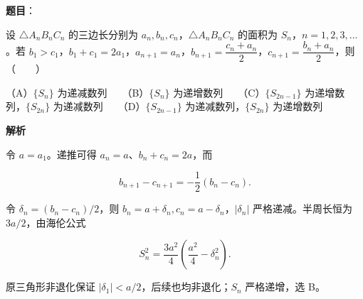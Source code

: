 \begin{answer}

\textbf{题目}：

设 $\triangle A_nB_nC_n$ 的三边长分别为 $a_n,b_n,c_n$，$\triangle A_nB_nC_n$ 的面积为 $S_n$，$n=1,2,3,\ldots$。若 $b_1>c_1$，$b_1+c_1=2a_1$，$a_{n+1}=a_n$，$b_{n+1}=\dfrac{c_n+a_n}{2}$，$c_{n+1}=\dfrac{b_n+a_n}{2}$，则\mbox{（　　）}

（A）$\{S_n\}$ 为递减数列　　（B）$\{S_n\}$ 为递增数列　　（C）$\{S_{2n-1}\}$ 为递增数列，$\{S_{2n}\}$ 为递减数列　　（D）$\{S_{2n-1}\}$ 为递减数列，$\{S_{2n}\}$ 为递增数列

\textbf{解析}

令 $a=a_1$。递推可得 $a_n=a$、$b_n+c_n=2a$，而

\nopagebreak[4]
\[
b_{n+1}-c_{n+1}=-\frac12(b_n-c_n).
\]

令 $\delta_n=(b_n-c_n)/2$，则 $b_n=a+\delta_n,c_n=a-\delta_n$，$|\delta_n|$ 严格递减。半周长恒为 $3a/2$，由海伦公式

\nopagebreak[4]
\[
S_n^2=\frac{3a^2}{4}\left(\frac{a^2}{4}-\delta_n^2\right).
\]

原三角形非退化保证 $|\delta_1|<a/2$，后续也均非退化；$S_n$ 严格递增，选 B。


\end{answer}

